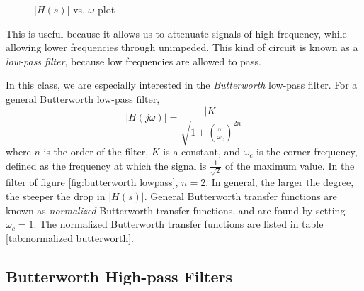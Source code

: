 \documentclass[nobib]{tufte-handout}
\begin{document}
\begin{figure}
    \begin{center}
    \end{center}
    \caption{$|H(s)|$ vs. $\omega$ plot}
    \label{fig:butterworth lowpass plot}
\end{figure}
This is useful because it allows us 
to attenuate signals of high frequency, 
while allowing lower frequencies through 
unimpeded. This kind of circuit is 
known as a \emph{low-pass filter}, 
because low frequencies are allowed 
to pass. 

In this class, we are especially interested in 
the \emph{Butterworth} low-pass 
filter. For a general Butterworth
low-pass filter, 
\begin{equation} \label{eq:butterworth}
    \lvert H(j\omega) \rvert = \frac{\lvert K \rvert}{\sqrt{1 + \left( \frac{\omega}{\omega_c} \right)^{2n}}}
\end{equation}
where $n$ is the order of the 
filter, $K$ is a constant, and 
$\omega_c$ is the corner 
frequency, defined as the 
frequency at which the signal 
is $\frac{1}{\sqrt{2}}$ of 
the maximum value. In
the filter of figure \ref{fig:butterworth lowpass},
$n = 2$. In general, the 
larger the degree, the 
steeper the drop in 
$|H(s)|$.  
General Butterworth transfer
functions are known as 
\emph{normalized} Butterworth 
transfer functions, and 
are found by setting $\omega_c = 1$.
The normalized Butterworth 
transfer functions are listed in 
table \ref{tab:normalized butterworth}.

\subsection{Butterworth High-pass Filters}
\end{document}
